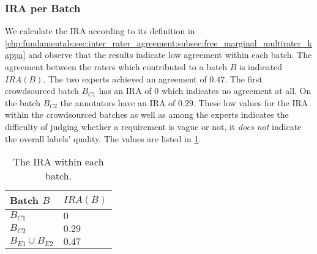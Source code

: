 \subsubsection{\Ac{IRA} per Batch}
We calculate the \ac{IRA} according to its definition in \cref{chp:fundamentals:sec:inter_rater_agreement:subsec:free_marginal_multirater_kappa} and observe that the results indicate low agreement within each batch.
The agreement between the raters which contributed to a batch $B$ is indicated $IRA(B)$.
The two experts achieved an agreement of $0.47$.
The first crowdsourced batch $B_{C1}$ has an \ac{IRA} of $0$ which indicates no agreement at all.
On the batch $B_{C2}$ the annotators have an \ac{IRA} of $0.29$.
These low values for the \ac{IRA} within the crowdsourced batches as well as among the experts indicates the difficulty of judging whether a requirement is vague or not, it \textit{does not} indicate the overall labels' quality.
The values are listed in \cref{tab:study:objects:crowdsourcing:batches:IRA}.
\begin{table}[htpb]
    \centering
    \begin{tabular}{l l}
        \toprule
        Batch $B$ & $IRA(B)$ \\
        \midrule
        $B_{C1}$ & $0$\\
        $B_{C2}$ & $0.29$\\
        $B_{E1} \cup B_{E2}$ & $0.47$ \\
        \bottomrule
    \end{tabular}
    \caption[Inter rater agreement within the batches]{The \ac{IRA} within each batch.}\label{tab:study:objects:crowdsourcing:batches:IRA}
\end{table}

